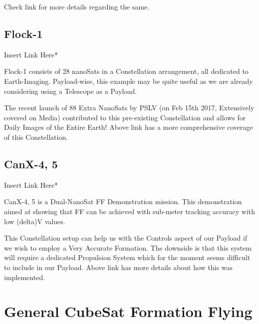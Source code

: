 \documentclass[12pt, a4paper, oneside]{book}
\begin{document}
\vspace{0.3cm}

Check link for more details regarding the same.

\subsection{Flock-1}

\vspace{0cm}

Insert Link Here*

\vspace{0.3cm}

Flock-1 consists of 28 nanoSats in a Constellation arrangement, all dedicated to Earth-Imaging. Payload-wise, this example may be quite useful as we are already considering using a Telescope as a Payload.

\vspace{0.3cm}

The recent launch of 88 Extra NanoSats by PSLV (on Feb 15th 2017, Extensively covered on Media) contributed to this pre-existing Constellation and allows for Daily Images of the Entire Earth! Above link has a more comprehensive coverage of this Constellation.

\subsection{CanX-4, 5}

\vspace{0cm}

Insert Link Here*

\vspace{0.3cm}

CanX-4, 5 is a Dual-NanoSat FF Demonstration mission. This demonstration aimed at showing that FF can be achieved with sub-meter tracking accuracy with low (delta)V values.

\vspace{0.3cm}

This Constellation setup can help us with the Controls aspect of our Payload if we wish to employ a Very Accurate Formation. The downside is that this system will require a dedicated Propulsion System which for the moment seems difficult to include in our Payload. Above link has more details about how this was implemented.

\clearpage

\section{General CubeSat Formation Flying}
\end{document}
